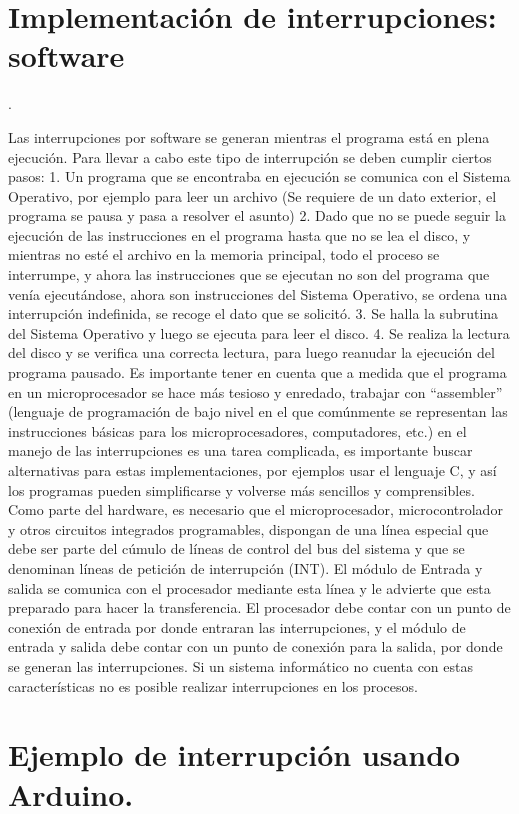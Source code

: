 \documentclass{article}
\begin{document}
\section{Implementación de interrupciones: software}.\cite{ArquictComp}

Las interrupciones por software se generan mientras el programa está en plena ejecución. Para llevar a cabo este tipo de interrupción se deben cumplir ciertos pasos:
1. Un programa que se encontraba en ejecución se comunica con el Sistema Operativo, por ejemplo para leer un archivo (Se requiere de un dato exterior, el programa se pausa y pasa a resolver el asunto)
2. Dado que no se puede seguir la ejecución de las instrucciones en el programa hasta que no se lea el disco, y mientras no esté el archivo en la memoria principal, todo el proceso se interrumpe, y ahora las instrucciones que se ejecutan no son del programa que venía ejecutándose, ahora son instrucciones del Sistema Operativo, se ordena una interrupción indefinida, se recoge el dato que se solicitó.
3. Se halla la subrutina del Sistema Operativo y luego se ejecuta para leer el disco.
4. Se realiza la lectura del disco y se verifica una correcta lectura, para luego reanudar la ejecución del programa pausado.
Es importante tener en cuenta que a medida que el programa en un microprocesador se hace más tesioso y enredado, trabajar con “assembler” (lenguaje de programación de bajo nivel en el que comúnmente se representan las instrucciones básicas para los microprocesadores, computadores, etc.) en el manejo de  las interrupciones es una tarea complicada, es importante buscar alternativas para estas implementaciones, por ejemplos usar el lenguaje C, y así los programas pueden simplificarse y volverse más sencillos y comprensibles.
Como parte del hardware, es necesario que el microprocesador, microcontrolador y otros circuitos integrados programables, dispongan de una línea especial que debe ser parte del cúmulo de líneas de control del bus del sistema y que se denominan líneas de petición de interrupción (INT). El módulo de Entrada y salida se comunica con el procesador mediante esta línea y le advierte que esta preparado para hacer la transferencia. El procesador debe contar con un punto de conexión de entrada por donde entraran las interrupciones, y el módulo de entrada y salida debe contar con un punto de conexión para la salida, por donde se generan las interrupciones. Si un sistema informático no cuenta con estas características no es posible realizar interrupciones en los procesos.

\section{Ejemplo de interrupción usando Arduino.} \cite{arduino}
\end{document}

